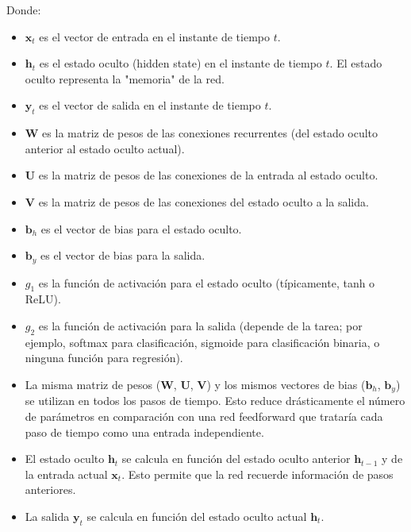 \documentclass{article}
\begin{document}
Donde:

\begin{itemize}
    \item \(\mathbf{x}_t\) es el vector de entrada en el instante de tiempo \(t\).
    \item \(\mathbf{h}_t\) es el estado oculto (hidden state) en el instante de tiempo \(t\).  El estado oculto representa la "memoria" de la red.
    \item \(\mathbf{y}_t\) es el vector de salida en el instante de tiempo \(t\).
    \item \(\mathbf{W}\) es la matriz de pesos de las conexiones recurrentes (del estado oculto anterior al estado oculto actual).
    \item \(\mathbf{U}\) es la matriz de pesos de las conexiones de la entrada al estado oculto.
    \item \(\mathbf{V}\) es la matriz de pesos de las conexiones del estado oculto a la salida.
    \item \(\mathbf{b}_h\) es el vector de bias para el estado oculto.
    \item \(\mathbf{b}_y\) es el vector de bias para la salida.
    \item \(g_1\) es la función de activación para el estado oculto (típicamente, tanh o ReLU).
    \item \(g_2\) es la función de activación para la salida (depende de la tarea; por ejemplo, softmax para clasificación, sigmoide para clasificación binaria, o ninguna función para regresión).
\end{itemize}

\begin{itemize}
    \item La misma matriz de pesos (\(\mathbf{W}\), \(\mathbf{U}\), \(\mathbf{V}\)) y los mismos vectores de bias (\(\mathbf{b}_h\), \(\mathbf{b}_y\)) se utilizan en todos los pasos de tiempo.  Esto reduce drásticamente el número de parámetros en comparación con una red feedforward que trataría cada paso de tiempo como una entrada independiente.
    \item El estado oculto \(\mathbf{h}_t\) se calcula en función del estado oculto anterior \(\mathbf{h}_{t-1}\) y de la entrada actual \(\mathbf{x}_t\).  Esto permite que la red recuerde información de pasos anteriores.
    \item La salida \(\mathbf{y}_t\) se calcula en función del estado oculto actual \(\mathbf{h}_t\).
\end{itemize}
\end{document}

